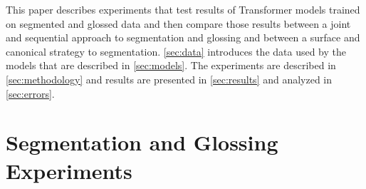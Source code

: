 This paper describes experiments that test results of Transformer models \citep{vaswani_attention_2017} trained on segmented and glossed data and then compare those results between a joint and sequential approach to segmentation and glossing and between a surface and canonical strategy to segmentation. \autoref{sec:data} introduces the data used by the models that are described in \autoref{sec:models}. The experiments are described in \autoref{sec:methodology} and results are presented in \autoref{sec:results} and analyzed in \autoref{sec:errors}. 



\begin{comment}

\section{Data}
\label{sec:data}

Each project's unique priorities and workflow resulted in different amounts of data and percentages of segmented and glossed tokens, as shown in Table \ref{tab:dissdata}. .

\begin{table}
    \centering
    \begin{tabular}{l|r|rc}
         \textbf{Language} & \textbf{Tokens} & \multicolumn{2}{c}{\textbf{Seg/Gloss}} \\
         \hline
         Alas & 4.5k & 3,775 & 85\%  \\
         \hline
         Lamkang & 101k & 49,465 & 49\% \\
         \hline
         Lezgi & 14k & 13,262  & 94\% \\
         \hline
         Manipuri & 12k & 11,904 & 98\% \\
         \hline
         Natügu & 16.5k & 13,925 & 84\%  \\
         \hline
         Upper Tanana & 11,867 & 67\% 
    \end{tabular}
    \caption[Data for Segmentation and Glossing]{The approximate total token considers multiple word expressions (when parsed as such) as single tokens. The percentage and total number of tokens that are both segmented (canonical and surface) and glossed are shown.}
    \label{tab:data}
\end{table}

\end{comment}



\section{Segmentation and Glossing Experiments}
\label{sec:methodology}

